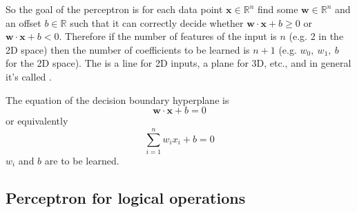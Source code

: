 \documentclass[a4paper]{article}
\begin{document}
So the goal of the perceptron is for each data point $\textbf{x}\in \mathbb{R}^n$ find some $\textbf{w}\in \mathbb{R}^n$ and an offset $b\in \mathbb{R}$ such that it can correctly decide whether $\textbf{w}\cdot \textbf{x} + b \geq 0$ or  $\textbf{w}\cdot \textbf{x} + b < 0$. Therefore if the number of features of the input is $n$ (e.g. 2 in the 2D space) then the number of coefficients to be learned is $n+1$ (e.g. $w_0,\ w_1,\ b$ for the 2D space). The  is a line for 2D inputs, a plane for 3D, etc., and in general it's called .
\begin{definition}
The equation of the decision boundary hyperplane is 
\begin{equation}
    \textbf{w}\cdot \textbf{x} + b = 0
\end{equation}
or equivalently
\begin{equation}
    \sum\limits_{i=1}^{n}{w_ix_i} + b = 0
\end{equation}
$w_i$ and $b$ are to be learned.
\end{definition}

\subsection{Perceptron for logical operations}
\end{document}

